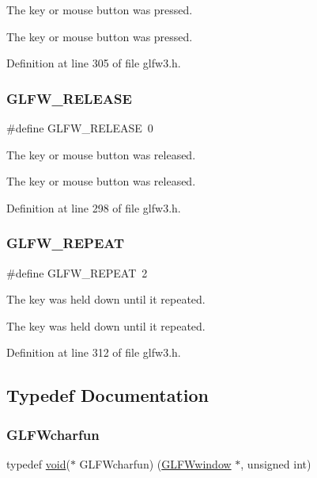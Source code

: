 The key or mouse button was pressed. 

The key or mouse button was pressed. 

Definition at line 305 of file glfw3.\+h.

\mbox{\label{group__input_gada11d965c4da13090ad336e030e4d11f}} 
\subsubsection{\texorpdfstring{GLFW\_RELEASE}{GLFW\_RELEASE}}
{\footnotesize\ttfamily \#define G\+L\+F\+W\+\_\+\+R\+E\+L\+E\+A\+SE~0}



The key or mouse button was released. 

The key or mouse button was released. 

Definition at line 298 of file glfw3.\+h.

\mbox{\label{group__input_gac96fd3b9fc66c6f0eebaf6532595338f}} 
\subsubsection{\texorpdfstring{GLFW\_REPEAT}{GLFW\_REPEAT}}
{\footnotesize\ttfamily \#define G\+L\+F\+W\+\_\+\+R\+E\+P\+E\+AT~2}



The key was held down until it repeated. 

The key was held down until it repeated. 

Definition at line 312 of file glfw3.\+h.



\subsection{Typedef Documentation}
\mbox{\label{group__input_gabf24451c7ceb1952bc02b17a0d5c3e5f}} 
\subsubsection{\texorpdfstring{GLFWcharfun}{GLFWcharfun}}
{\footnotesize\ttfamily typedef \mbox{\hyperlink{glad_8h_a950fc91edb4504f62f1c577bf4727c29}{void}}($\ast$  G\+L\+F\+Wcharfun) (\mbox{\hyperlink{group__window_ga3c96d80d363e67d13a41b5d1821f3242}{G\+L\+F\+Wwindow}} $\ast$, unsigned int)}



